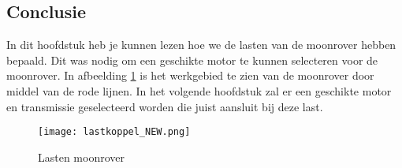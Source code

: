 \newpage

\subsection{Conclusie}
In dit hoofdstuk heb je kunnen lezen hoe we de lasten van de moonrover hebben bepaald. Dit was nodig om een geschikte motor te kunnen selecteren voor de moonrover.  In afbeelding \ref{fig:lasten moonrover} is het werkgebied te zien van de moonrover door middel van de rode lijnen. In het volgende hoofdstuk zal er een geschikte motor en transmissie geselecteerd worden die juist aansluit bij deze last. 

\begin{figure}[H]
    \centering
    \texttt{[image: lastkoppel\_NEW.png]}
    \caption{Lasten moonrover}
    \label{fig:lasten moonrover}
\end{figure}
    
